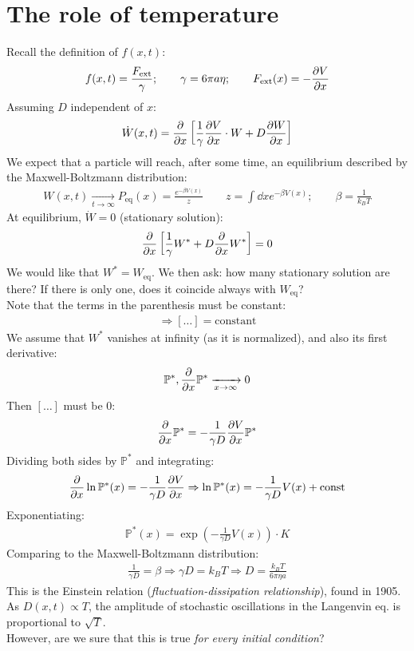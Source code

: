 \documentclass[../template.tex]{subfiles}
\begin{document}
\section{The role of temperature} %
Recall the definition of $f(x,t)$:
\begin{align*}
    f(x,t) = \frac{F_{\mathrm{ext} }}{\gamma}; \qquad \gamma = 6 \pi a \eta; \qquad F_{\mathrm{ext} }(x) = -\pdv{V}{x} (x) 
\end{align*} 
Assuming $D$ independent of $x$:
\begin{align*}
    \dot{W}(x,t) = \pdv{x}\left[\frac{1}{\gamma} \pdv{V}{x} \cdot W + D \pdv{W}{x} \right]
\end{align*}  
We expect that a particle will reach, after some time, an equilibrium described by the Maxwell-Boltzmann distribution:
\begin{align*}
    W(x,t)  \xrightarrow[t \to \infty]{}  P_{\mathrm{eq} }(x) = \frac{e^{- \beta V(x)}}{z} \qquad z = \int \dd{x} e^{- \beta V(x)}; \qquad \beta = \frac{1}{k_B T} 
\end{align*}
At equilibrium, $\dot{W} = 0$ (stationary solution):
\begin{align*}
    \pdv{x}\left[\frac{1}{\gamma} W^* + D \pdv{x} W^* \right] = 0
\end{align*}
We would like that $W^* = W_{\mathrm{eq}}$. We then ask: how many stationary solution are there? If there is only one, does it coincide always with $W_{\mathrm{eq} }$?\\

Note that the terms in the parenthesis must be constant:
\begin{align*}
    \Rightarrow [\dots] = \text{constant}
\end{align*}
We assume that $W^*$ vanishes at infinity  (as it is normalized), and also its first derivative:
\begin{align*}
    \mathbb{P}^*, \pdv{x} \mathbb{P}^*  \xrightarrow[x \to \infty]{}  0
\end{align*}
Then $[\dots]$ must be $0$:
\begin{align*}
    \pdv{x} \mathbb{P}^* = - \frac{1}{\gamma D} \pdv{V}{x} \mathbb{P}^* 
\end{align*}  
Dividing both sides by $\mathbb{P}^*$  and integrating:
\begin{align*}
    \pdv{x}\ln \mathbb{P}^*(x) = -\frac{1}{\gamma D} \pdv{V}{x} \Rightarrow \ln \mathbb{P}^*(x) = -\frac{1}{\gamma D} V(x) + \text{const}  
\end{align*}
Exponentiating:
\begin{align*}
    \mathbb{P}^*(x) = \exp\left(-\frac{1}{\gamma D} V(x) \right) \cdot K
\end{align*}
Comparing to the Maxwell-Boltzmann distribution:
\begin{align*}
    \frac{1}{\gamma D} = \beta \Rightarrow \gamma D = k_B T \Rightarrow D = \frac{k_B T}{6 \pi \eta a }  
\end{align*}
This is the Einstein relation (\textit{fluctuation-dissipation relationship}), found in 1905. As $D(x,t) \propto T$, the amplitude of stochastic oscillations in the Langenvin eq. is proportional to $\sqrt{T}$.\\

However, are we sure that this is true \textit{for every initial condition}? 
\end{document}
